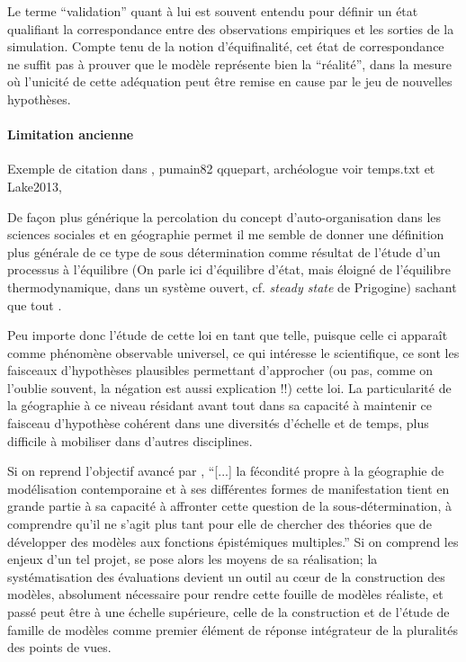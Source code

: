 Le terme \enquote{validation} quant à lui est souvent entendu pour définir un état qualifiant la correspondance entre des observations empiriques et les sorties de la simulation. Compte tenu de la notion d'équifinalité, cet état de correspondance ne suffit pas à prouver que le modèle représente bien la \enquote{réalité}, dans la mesure où l’unicité de  cette adéquation peut être remise en cause par le jeu de nouvelles hypothèses. 

\paragraph{Limitation ancienne}
Exemple de citation dans \textcite[192]{Sheps1971}, pumain82 qquepart, archéologue voir temps.txt et Lake2013, 

De façon plus générique la percolation du concept d'auto-organisation dans les sciences sociales et en géographie permet il me semble de donner une définition plus générale de ce type de sous détermination comme résultat de l'étude d'un processus à l'équilibre (On parle ici d'équilibre d'état, mais éloigné de l'équilibre thermodynamique, dans un système ouvert, cf. \textit{steady state} de Prigogine) sachant que tout . 

Peu importe donc l'étude de cette loi en tant que telle, puisque celle ci apparaît comme phénomène observable universel, ce qui intéresse le scientifique, ce sont les faisceaux d'hypothèses plausibles permettant d'approcher (ou pas, comme on l'oublie souvent, la négation est aussi explication !!) cette loi. La particularité de la géographie à ce niveau résidant avant tout dans sa capacité à maintenir ce faisceau d'hypothèse cohérent dans une diversités d'échelle et de temps, plus difficile à mobiliser dans d'autres disciplines.

Si on reprend l'objectif avancé par \autocite{Varenne2014}, \enquote{[...] la fécondité propre à la géographie de modélisation contemporaine et à ses différentes formes de manifestation tient en grande partie à sa capacité à affronter cette question de la sous-détermination, à comprendre qu’il ne s’agit plus tant pour elle de chercher des théories que de développer des modèles aux fonctions épistémiques multiples.} Si on comprend les enjeux d'un tel projet, se pose alors les moyens de sa réalisation; la systématisation des évaluations devient un outil au cœur de la construction des modèles, absolument nécessaire pour rendre cette fouille de modèles réaliste, et passé peut être à une échelle supérieure, celle de la construction et de l'étude de famille de modèles comme premier élément de réponse intégrateur de la pluralités des points de vues.

